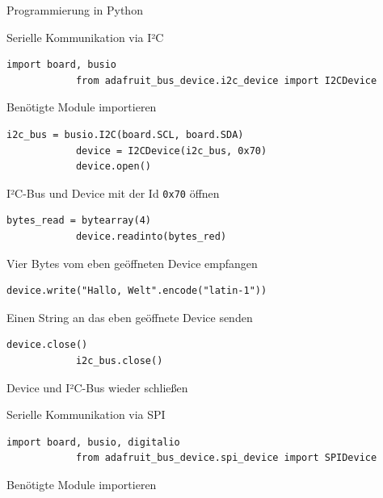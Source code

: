 {
\setlength{\leftmargini}{1.2em}
\footnotesize

\begin{frame}{Programmierung in Python}
    \begin{block}{Serielle Kommunikation via I²C}
        \begin{lstlisting}[style=MethodenListeKlein, gobble=12]
            import board, busio
            from adafruit_bus_device.i2c_device import I2CDevice
        \end{lstlisting}
        Benötigte Module importieren
        \smallskip

        \begin{lstlisting}[style=MethodenListeKlein, gobble=12]
            i2c_bus = busio.I2C(board.SCL, board.SDA)
            device = I2CDevice(i2c_bus, 0x70)
            device.open()
        \end{lstlisting}
        I²C-Bus und Device mit der Id \texttt{0x70} öffnen
        \smallskip

        \begin{lstlisting}[style=MethodenListeKlein, gobble=12]
            bytes_read = bytearray(4)
            device.readinto(bytes_red)
        \end{lstlisting}
        Vier Bytes vom eben geöffneten Device empfangen
        \smallskip

        \begin{lstlisting}[style=MethodenListeKlein, gobble=12]
            device.write("Hallo, Welt".encode("latin-1"))
        \end{lstlisting}
        Einen String an das eben geöffnete Device senden
        \smallskip

        \begin{lstlisting}[style=MethodenListeKlein, gobble=12]
            device.close()
            i2c_bus.close()
        \end{lstlisting}
        Device und I²C-Bus wieder schließen
        \smallskip
    \end{block}

    \framebreak

    \begin{block}{Serielle Kommunikation via SPI}
        \begin{lstlisting}[style=MethodenListeKlein, gobble=12]
            import board, busio, digitalio
            from adafruit_bus_device.spi_device import SPIDevice
        \end{lstlisting}
        Benötigte Module importieren
        \smallskip


\end{block}
\end{frame}}
